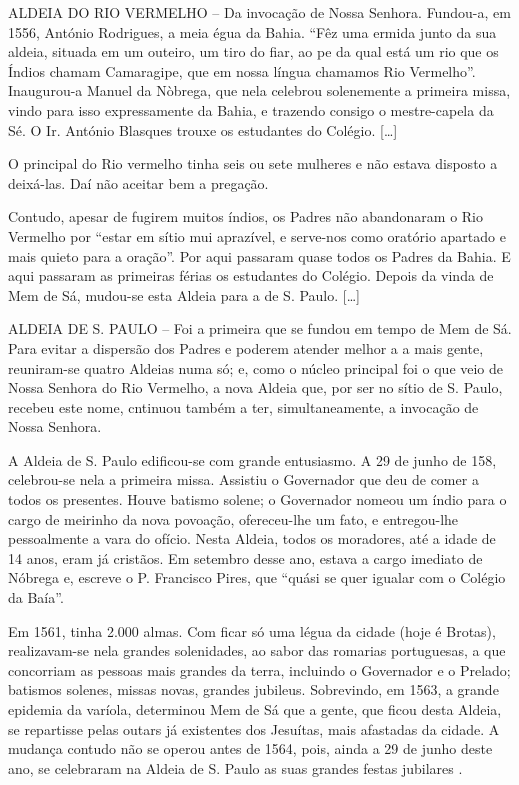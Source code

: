 \begin{citacao}
ALDEIA DO RIO VERMELHO – Da invocação de Nossa Senhora. Fundou-a, em 1556, António Rodrigues, a meia égua da Bahia. ``Fêz uma ermida junto da sua aldeia, situada em um outeiro, um tiro do fiar, ao pe da qual está um rio que os Índios chamam Camaragipe, que em nossa língua chamamos Rio Vermelho''. Inaugurou-a Manuel da Nòbrega, que nela celebrou solenemente a primeira missa, vindo para isso expressamente da Bahia, e trazendo consigo o mestre-capela da Sé. O Ir. António Blasques trouxe os estudantes do Colégio. [\dots]
 
O principal do Rio vermelho tinha seis ou sete mulheres e não estava disposto a deixá-las. Daí não aceitar bem a pregação.

Contudo, apesar de fugirem muitos índios, os Padres não abandonaram o Rio Vermelho por ``estar em sítio mui aprazível, e serve-nos como oratório apartado e mais quieto para a oração''. Por aqui passaram quase todos os Padres da Bahia. E aqui passaram as primeiras férias os estudantes do Colégio. Depois da vinda de Mem de Sá, mudou-se esta Aldeia para a de S. Paulo. [\dots]

ALDEIA DE S. PAULO – Foi a primeira que se fundou em tempo de Mem de Sá. Para evitar a dispersão dos Padres e poderem atender melhor a a mais gente, reuniram-se quatro Aldeias numa só; e, como o núcleo principal foi o que veio de Nossa Senhora do Rio Vermelho, a nova Aldeia que, por ser no sítio de S. Paulo, recebeu este nome, cntinuou também a ter, simultaneamente, a invocação de Nossa Senhora.

A Aldeia de S. Paulo edificou-se com grande entusiasmo. A 29 de junho de 158, celebrou-se nela a primeira missa. Assistiu o Governador que deu de comer a todos os presentes. Houve batismo solene; o Governador nomeou um índio para o cargo de meirinho da nova povoação, ofereceu-lhe um fato, e entregou-lhe pessoalmente a vara do ofício. Nesta Aldeia, todos os moradores, até a idade de 14 anos, eram já cristãos. Em setembro desse ano, estava a cargo imediato de Nóbrega e, escreve o P. Francisco Pires, que ``quási se quer igualar com o Colégio da Baía''.

Em 1561, tinha 2.000 almas. Com ficar só uma légua da cidade (hoje é Brotas), realizavam-se nela grandes solenidades, ao sabor das romarias portuguesas, a que concorriam as pessoas mais grandes da terra, incluindo o Governador e o Prelado; batismos solenes, missas novas, grandes jubileus. Sobrevindo, em 1563, a grande epidemia da varíola, determinou Mem de Sá que a gente, que ficou desta Aldeia, se repartisse pelas outars já existentes dos Jesuítas, mais afastadas da cidade. A mudança contudo não se operou antes de 1564, pois, ainda a 29 de junho deste ano, se celebraram na Aldeia de S. Paulo as suas grandes festas jubilares \cite[p.~241]{leite_ciadejesus_2004}.
\end{citacao}

